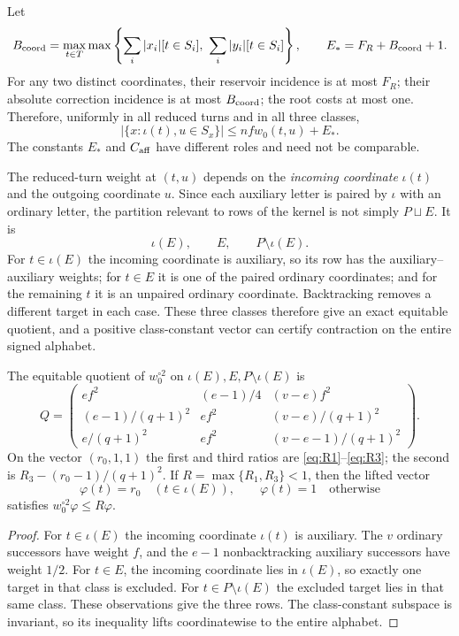 Let
\begin{equation}\label{eq:coordinate-bound}
 B_{\rm coord}=\max_{t\in T}\max\left\{
 \sum_i|x_i|[t\in S_i],\ \sum_i|y_i|[t\in S_i]\right\},
 \qquad E_*=F_R+B_{\rm coord}+1.
\end{equation}
For any two distinct coordinates, their reservoir incidence is at most $F_R$; their absolute correction incidence is at most $B_{\rm coord}$; the root costs at most one. Therefore, uniformly in all reduced turns and in all three classes,
\begin{equation}\label{eq:finite-candidate}
 |\{x:\iota(t),u\in S_x\}|\le nfw_0(t,u)+E_*.
\end{equation}
The constants $E_*$ and $C_{\rm aff}$ have different roles and need not be comparable.

The reduced-turn weight at $(t,u)$ depends on the \emph{incoming coordinate} $\iota(t)$ and the outgoing coordinate $u$. Since each auxiliary letter is paired by $\iota$ with an ordinary letter, the partition relevant to rows of the kernel is not simply $P\sqcup E$. It is
\[
 \iota(E),\qquad E,\qquad P\setminus\iota(E).
\]
For $t\in\iota(E)$ the incoming coordinate is auxiliary, so its row has the auxiliary--auxiliary weights; for $t\in E$ it is one of the paired ordinary coordinates; and for the remaining $t$ it is an unpaired ordinary coordinate. Backtracking removes a different target in each case. These three classes therefore give an exact equitable quotient, and a positive class-constant vector can certify contraction on the entire signed alphabet.

\begin{lemma}\label{lem:quotient}
The equitable quotient of $w_0^{\circ2}$ on $\iota(E),E,P\setminus\iota(E)$ is
\begin{equation}\label{eq:quotient}
 Q=\begin{pmatrix}
 ef^2&(e-1)/4&(v-e)f^2\\
 (e-1)/(q+1)^2&ef^2&(v-e)/(q+1)^2\\
 e/(q+1)^2&ef^2&(v-e-1)/(q+1)^2
 \end{pmatrix}.
\end{equation}
On the vector $(r_0,1,1)$ the first and third ratios are \eqref{eq:R1}--\eqref{eq:R3}; the second is $R_3-(r_0-1)/(q+1)^2$. If $R=\max\{R_1,R_3\}<1$, then the lifted vector
\[
 \varphi(t)=r_0\quad(t\in\iota(E)),\qquad \varphi(t)=1\quad\text{otherwise}
\]
satisfies $w_0^{\circ2}\varphi\le R\varphi$.
\end{lemma}
\begin{proof}
For $t\in\iota(E)$ the incoming coordinate $\iota(t)$ is auxiliary. The $v$ ordinary successors have weight $f$, and the $e-1$ nonbacktracking auxiliary successors have weight $1/2$. For $t\in E$, the incoming coordinate lies in $\iota(E)$, so exactly one target in that class is excluded. For $t\in P\setminus\iota(E)$ the excluded target lies in that same class. These observations give the three rows. The class-constant subspace is invariant, so its inequality lifts coordinatewise to the entire alphabet.
\end{proof}

